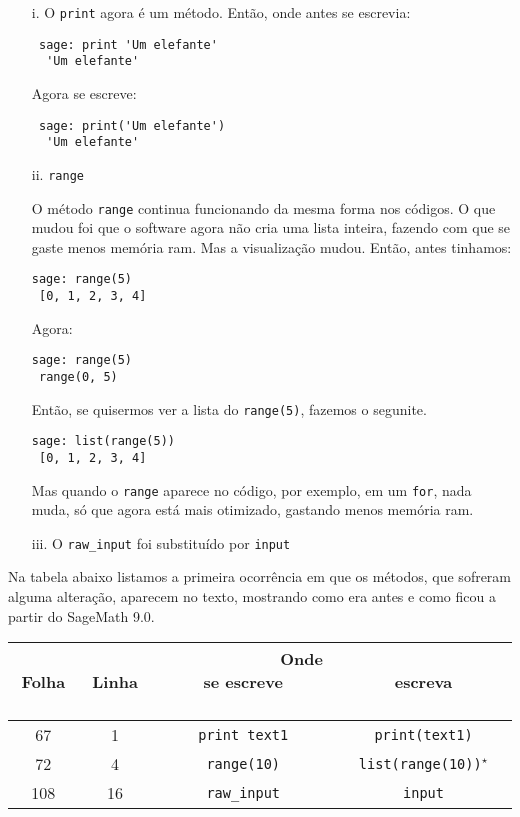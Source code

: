 \documentclass[12pt,a4paper]{report}
\begin{document}
\begin{itemize}
 \item [i.] O \verb|print| agora é um método. Então, onde antes se escrevia: 
 \begin{verbatim}
 sage: print 'Um elefante'
  'Um elefante'
 \end{verbatim}
Agora se escreve:
 \begin{verbatim}
 sage: print('Um elefante')
  'Um elefante'
 \end{verbatim}
 
 \item [ii.] \verb|range|
 
 O método \verb|range| continua funcionando da mesma forma nos códigos. O que mudou foi que o software agora não cria uma lista inteira, fazendo com que se gaste menos memória ram. Mas a visualização mudou.
 Então, antes tinhamos:
 \begin{verbatim}
sage: range(5)
 [0, 1, 2, 3, 4]
 \end{verbatim}
Agora:
 \begin{verbatim}
sage: range(5)
 range(0, 5)
 \end{verbatim}
 Então, se quisermos ver a lista do \verb|range(5)|, fazemos o segunite.
 \begin{verbatim}
sage: list(range(5))
 [0, 1, 2, 3, 4]
\end{verbatim}
Mas quando o \verb|range| aparece no código, por exemplo, em um \verb|for|, nada muda, só que agora está mais otimizado, gastando menos memória ram.

\item [iii.] O \verb|raw_input| foi substituído por \verb|input|
\end{itemize}


\vspace{1cm}

Na tabela abaixo listamos a primeira ocorrência em que os métodos, que sofreram alguma alteração, aparecem no texto, mostrando como era antes e como ficou a partir do SageMath 9.0.

\centering
\setlength{\extrarowheight}{1.5pt}
\begin{tabular}{|c|c|c|c|}
\hline
 ~~ Folha ~~ & ~~ Linha ~~ & ~~~~~~~~~~~~ Onde se escreve ~~~~~~~~~~~~ & ~~~~~~~~~~~~ escreva ~~~~~~~~~~~~ \\
\hline \hline
 67 & 1 & \verb|print text1|  & \verb|print(text1)| \\ \hline
 72 & 4 & \verb|range(10)| &  \verb|list(range(10))|$^\star$ \\ \hline
 108 &  16 & \verb|raw_input| & \verb|input| \\ \hline
\end{tabular}
\end{document}

